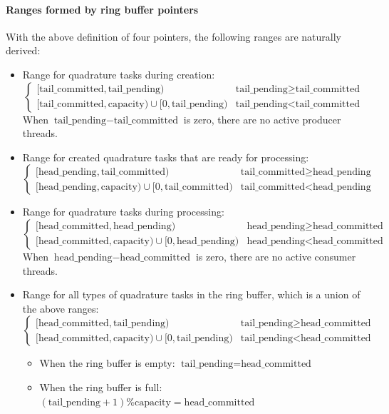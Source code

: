 \documentclass[11pt, a4paper]{article}
\begin{document}
\paragraph{Ranges formed by ring buffer pointers}

With the above definition of four pointers, the following ranges are naturally derived:
\begin{itemize}
\item Range for quadrature tasks during creation:
  $$
  \begin{cases}
    [\text{tail\_committed}, \text{tail\_pending}) & \text{tail\_pending} \geq
    \text{tail\_committed} \\
    [\text{tail\_committed}, \text{capacity}) \cup [0, \text{tail\_pending}) &
    \text{tail\_pending} < \text{tail\_committed}
  \end{cases}
  $$
  When $\text{tail\_pending} - \text{tail\_committed}$ is zero, there are no active
  producer threads.
\item Range for created quadrature tasks that are ready for processing:
  $$
  \begin{cases}
    [\text{head\_pending}, \text{tail\_committed}) & \text{tail\_committed} \geq
    \text{head\_pending} \\
    [\text{head\_pending}, \text{capacity}) \cup [0, \text{tail\_committed}) &
    \text{tail\_committed} < \text{head\_pending}
  \end{cases}
  $$
\item Range for quadrature tasks during processing:
  $$
  \begin{cases}
    [\text{head\_committed}, \text{head\_pending}) & \text{head\_pending} \geq
    \text{head\_committed} \\
    [\text{head\_committed}, \text{capacity}) \cup [0, \text{head\_pending}) &
    \text{head\_pending} < \text{head\_committed}
  \end{cases}
  $$
  When $\text{head\_pending} - \text{head\_committed}$ is zero, there are no active
  consumer threads.
\item Range for all types of quadrature tasks in the ring buffer, which is a union of the
  above ranges:
  $$
  \begin{cases}
    [\text{head\_committed}, \text{tail\_pending}) & \text{tail\_pending} \geq
    \text{head\_committed} \\
    [\text{head\_committed}, \text{capacity}) \cup [0, \text{tail\_pending}) &
    \text{tail\_pending} < \text{head\_committed}
  \end{cases}
  $$
  \begin{itemize}
  \item When the ring buffer is empty: $\text{tail\_pending} = \text{head\_committed}$
  \item When the ring buffer is full:
    $(\text{tail\_pending} + 1) \% \text{capacity} = \text{head\_committed}$
  \end{itemize}
\end{itemize}
\end{document}
